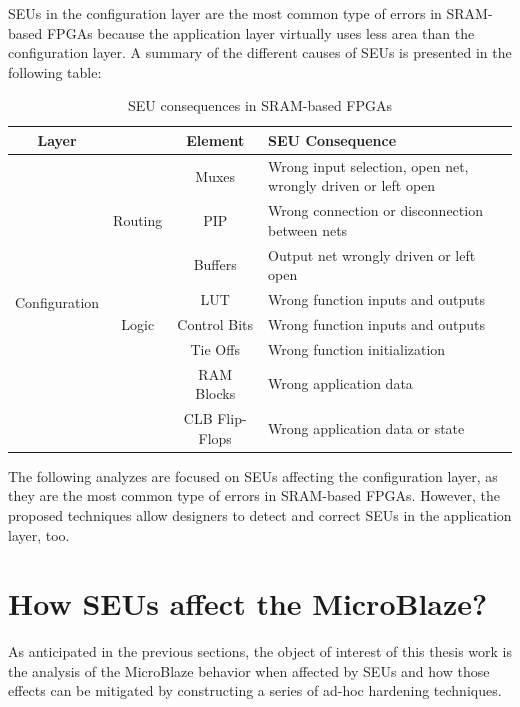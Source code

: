 SEUs in the configuration layer are the most common type of errors in SRAM-based FPGAs because the application layer virtually uses less area than the configuration layer. A summary of the different causes of SEUs is presented in the following table:

\begin{table}[H]
\centering
    \begin{tabular}{|cc|cp{6.2cm}|}
        \hline
        \textbf{Layer} & & \textbf{Element} & \textbf{SEU Consequence} \\
        \hline
        \multirow{12}{*}{Configuration}
        & & Muxes & Wrong input selection, open net, wrongly driven or left open\\
        \cline{3-4}
        & Routing & PIP & Wrong connection or disconnection between nets\\
        \cline{3-4}
        & & Buffers & Output net wrongly driven or left open\\
        \cline{2-4}
        & & LUT & Wrong function inputs and outputs \\
        \cline{3-4}
        & Logic & Control Bits & Wrong function inputs and outputs\\
        \cline{3-4}
        & & Tie Offs & Wrong function initialization\\
        \hline
        \multirow{2}{*}{Application}
        & & RAM Blocks & Wrong application data\\
        \cline{3-4}
        & & CLB Flip-Flops & Wrong application data or state\\
        \hline
    \end{tabular}
\caption{SEU consequences in SRAM-based FPGAs \cite{10.1145/1046192.1046212}}
\label{tab:conseq_fpgas_seu}
\end{table}

The following analyzes are focused on SEUs affecting the configuration layer, as they are the most common type of errors in SRAM-based FPGAs. However, the proposed techniques allow designers to detect and correct SEUs in the application layer, too.

\section{How SEUs affect the MicroBlaze?}

As anticipated in the previous sections, the object of interest of this thesis work is the analysis of the MicroBlaze behavior when affected by SEUs and how those effects can be mitigated by constructing a series of ad-hoc hardening techniques. \bigskip

